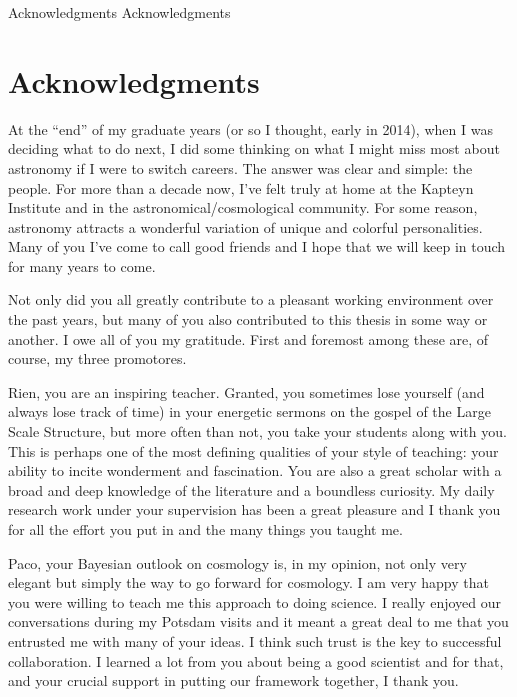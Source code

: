 
\markboth
{Acknowledgments}
{Acknowledgments}


\chapter*{Acknowledgments}

At the ``end'' of my graduate years (or so I thought, early in 2014), when I was deciding what to do next, I did some thinking on what I might miss most about astronomy if I were to switch careers.
The answer was clear and simple: the people.
For more than a decade now, I've felt truly at home at the Kapteyn Institute and in the astronomical/cosmological community.
For some reason, astronomy attracts a wonderful variation of unique and colorful personalities.
Many of you I've come to call good friends and I hope that we will keep in touch for many years to come.

Not only did you all greatly contribute to a pleasant working environment over the past years, but many of you also contributed to this thesis in some way or another.
I owe all of you my gratitude.
First and foremost among these are, of course, my three promotores.

Rien, you are an inspiring teacher.
Granted, you sometimes lose yourself (and always lose track of time) in your energetic sermons on the gospel of the Large Scale Structure, but more often than not, you take your students along with you.
This is perhaps one of the most defining qualities of your style of teaching: your ability to incite wonderment and fascination.
You are also a great scholar with a broad and deep knowledge of the literature and a boundless curiosity.
My daily research work under your supervision has been a great pleasure and I thank you for all the effort you put in and the many things you taught me.

Paco, your Bayesian outlook on cosmology is, in my opinion, not only very elegant but simply the way to go forward for cosmology.
I am very happy that you were willing to teach me this approach to doing science.
I really enjoyed our conversations during my Potsdam visits and it meant a great deal to me that you entrusted me with many of your ideas.
I think such trust is the key to successful collaboration.
I learned a lot from you about being a good scientist and for that, and your crucial support in putting our framework together, I thank you.

